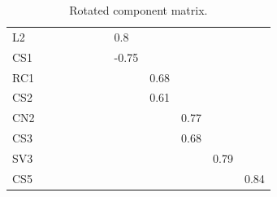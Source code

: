 \documentclass{sig-alternate-05-2015}
\begin{document}
\begin{table}[]
{\begin{tabular}{l|lllllllllll}
\multicolumn{1}{|l|}{L2}                          &                        &                        &                        &                        &                        &                        & 0.8                    &                        &                        &                         &                         \\ \cline{1-1}
\multicolumn{1}{|l|}{CS1}                         &                        &                        &                        &                        &                        &                        & -0.75                  &                        &                        &                         &                         \\ \cline{1-1}
\multicolumn{1}{|l|}{RC1}                         &                        &                        &                        &                        &                        &                        &                        & 0.68                   &                        &                         &                         \\ \cline{1-1}
\multicolumn{1}{|l|}{CS2}                         &                        &                        &                        &                        &                        &                        &                        & 0.61                   &                        &                         &                         \\ \cline{1-1}
\multicolumn{1}{|l|}{CN2}                         &                        &                        &                        &                        &                        &                        &                        &                        & 0.77                   &                         &                         \\ \cline{1-1}
\multicolumn{1}{|l|}{CS3}                         &                        &                        &                        &                        &                        &                        &                        &                        & 0.68                   &                         &                         \\ \cline{1-1}
\multicolumn{1}{|l|}{SV3}                         &                        &                        &                        &                        &                        &                        &                        &                        &                        & 0.79                    &                         \\ \cline{1-1}
\multicolumn{1}{|l|}{CS5}                         &                        &                        &                        &                        &                        &                        &                        &                        &                        &                         & 0.84                    \\ \cline{1-1}
\end{tabular}%
}
\caption{Rotated component matrix.}
\label{tbl:rotatedComponents}
\end{table}
\end{document}
